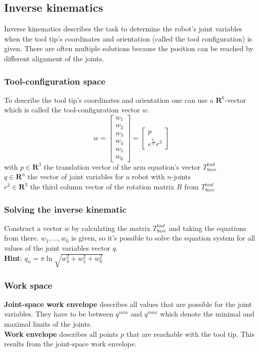 \documentclass[12pt]{article}
\begin{document}
	\subsection{Inverse kinematics}
	Inverse kinematics describes the task to determine the robot's joint variables when the tool tip's coordinates and orientation (called the tool configuration) is given. There are often multiple solutions because the position can be reached by different alignment of the joints.
	
	\subsubsection{Tool-configuration space}
	To describe the tool tip's coordinates and orientation one can use a $\mathbf{R}^6$-vector which is called the tool-configuration vector $w$.\\
	\begin{equation}
	w = 
	\begin{bmatrix}
	w_1 \\ w_2 \\ w_3 \\ w_4 \\ w_5 \\ w_6
	\end{bmatrix} = 
	\begin{bmatrix}
	p \\ e^{\frac{q_n}{\pi}}r^3
	\end{bmatrix}
	\end{equation}
	with $p \in \mathbf{R}^3$ the translation vector of the arm equation's vector $T^{tool}_{base}$\\
	$q \in \mathbf{R}^n$ the vector of joint variables for a robot with $n$-joints\\
	$r^3 \in \mathbf{R}^3$ the third column vector of the rotation matrix $R$ from $T^{tool}_{base}$
	
	\subsubsection{Solving the inverse kinematic}
	Construct a vector $w$ by calculating the matrix $T^{tool}_{base}$ and taking the equations from there. $w_1, ..., w_6$ is given, so it's possible to solve the equation system for all values of the joint variables vector $q$.\\
	\textbf{Hint}: $q_n = \pi \ln \sqrt{w_4^2+w_5^2+w_6^2}$

	\subsubsection{Work space}
	\textbf{Joint-space work envelope} describes all values that are possible for the joint variables. They have to be between $q^{min}$ and $q^{max}$ which denote the minimal and maximal limits of the joints.\\
	\textbf{Work envelope} describes all points $p$ that are reachable with the tool tip. This results from the joint-space work envelope.
	
\end{document}
